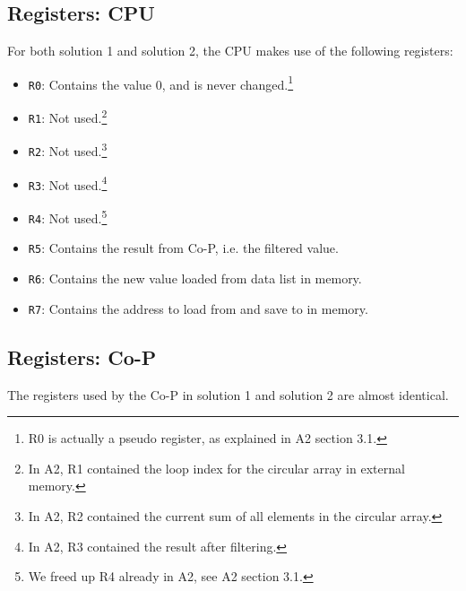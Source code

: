 \subsection{Registers: CPU}
\label{sec:registersCPU}
For both solution 1 and solution 2, the CPU makes use of the following registers:

\begin{itemize}
    \item \texttt{R0}: Contains the value 0, and is never changed.\footnote{R0 is actually a pseudo register, as explained in A2 section 3.1.} 
    \item \texttt{R1}: Not used.\footnote{In A2, R1 contained the loop index for the circular array in external memory.}
    \item \texttt{R2}: Not used.\footnote{In A2, R2 contained the current sum of all elements in the circular array.}
    \item \texttt{R3}: Not used.\footnote{In A2, R3 contained the result after filtering.}
    \item \texttt{R4}: Not used.\footnote{We freed up R4 already in A2, see A2 section 3.1.}
    \item \texttt{R5}: Contains the result from Co-P, i.e. the filtered value.
    \item \texttt{R6}: Contains the new value loaded from data list in memory.
    \item \texttt{R7}: Contains the address to load from and save to in memory.
\end{itemize}

\subsection{Registers: Co-P}
\label{sec:registersCoP}
The registers used by the Co-P in solution 1 and solution 2 are almost identical.

